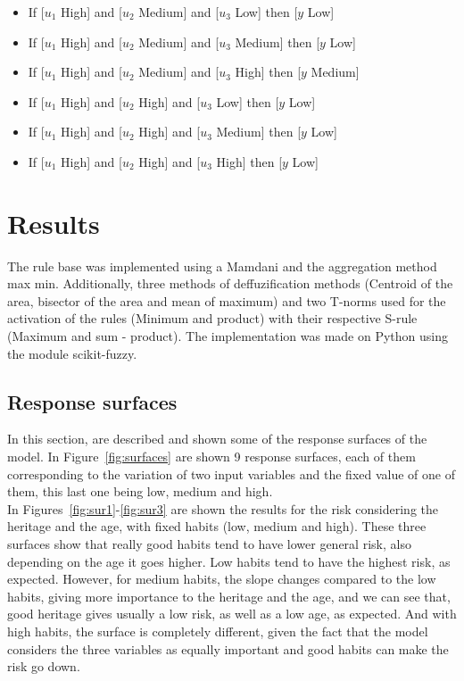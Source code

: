 \documentclass[conference]{IEEEtran}
\begin{document}
\begin{itemize}
\item If [$u_1$ High] and [$u_2$ Medium] and [$u_3$ Low] then [$y$ Low]
\item If [$u_1$ High] and [$u_2$ Medium] and [$u_3$ Medium] then [$y$ Low]
\item If [$u_1$ High] and [$u_2$ Medium] and [$u_3$ High] then [$y$ Medium]
\item If [$u_1$ High] and [$u_2$ High] and [$u_3$ Low] then [$y$ Low]
\item If [$u_1$ High] and [$u_2$ High] and [$u_3$ Medium] then [$y$ Low]
\item If [$u_1$ High] and [$u_2$ High] and [$u_3$ High] then [$y$ Low]
\end{itemize}

\section{Results}
The rule base was implemented using a Mamdani and the aggregation method max min. Additionally, three methods of deffuzification methods (Centroid of the area, bisector of the area and mean of maximum) and two T-norms used for the activation of the rules (Minimum and product) with their respective S-rule (Maximum and sum - product). The implementation was made on Python using the module scikit-fuzzy. \\

\subsection{Response surfaces}
In this section, are described and shown some of the response surfaces of the model. In Figure~\ref{fig:surfaces} are shown 9 response surfaces, each of them corresponding to the variation of two input variables and the fixed value of one of them, this last one being low, medium and high. \\

In Figures~\ref{fig:sur1}-\ref{fig:sur3} are shown the results for the risk considering the heritage and the age, with fixed habits (low, medium and high). These three surfaces show that really good habits tend to have lower general risk, also depending on the age it goes higher. Low habits tend to have the highest risk, as expected. However, for medium habits, the slope changes compared to the low habits, giving more importance to the heritage and the age, and we can see that, good heritage gives usually a low risk, as well as a low age, as expected. And with high habits, the surface is completely different, given the fact that the model considers the three variables as equally important and good habits can make the risk go down.\\ 
\end{document}
